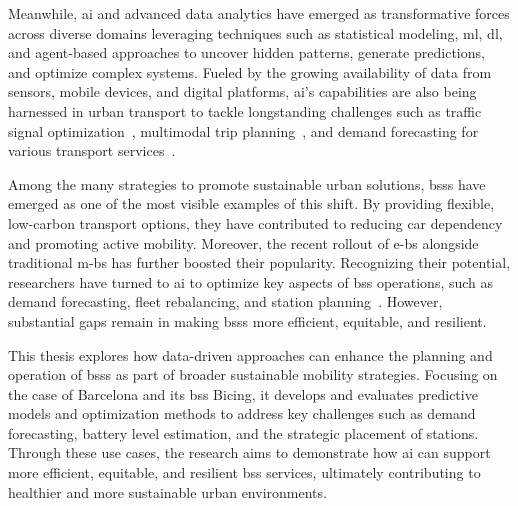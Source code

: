 Meanwhile, \ac{ai} and advanced data analytics have emerged as transformative forces across diverse domains leveraging techniques such as statistical modeling, \ac{ml}, \ac{dl}, and agent-based approaches to uncover hidden patterns, generate predictions, and optimize complex systems. Fueled by the growing availability of data from sensors, mobile devices, and digital platforms, \ac{ai}’s capabilities are also being harnessed in urban transport to tackle longstanding challenges such as traffic signal optimization~\cite{Meess2024}, multimodal trip planning~\cite{Liu2021}, and demand forecasting for various transport services~\cite{Ma2024, Gallo2019}.

Among the many strategies to promote sustainable urban solutions, \acp{bss} have emerged as one of the most visible examples of this shift. By providing flexible, low-carbon transport options, they have contributed to reducing car dependency and promoting active mobility. Moreover, the recent rollout of \acp{e-b} alongside traditional \acp{m-b} has further boosted their popularity. Recognizing their potential, researchers have turned to \ac{ai} to optimize key aspects of \ac{bss} operations, such as demand forecasting, fleet rebalancing, and station planning~\cite{Albuquerque2021, Bahadori2021}. However, substantial gaps remain in making \acp{bss} more efficient, equitable, and resilient.

This thesis explores how data-driven approaches can enhance the planning and operation of \acp{bss} as part of broader sustainable mobility strategies. Focusing on the case of Barcelona and its \ac{bss} Bicing, it develops and evaluates predictive models and optimization methods to address key challenges such as demand forecasting, battery level estimation, and the strategic placement of stations. Through these use cases, the research aims to demonstrate how \ac{ai} can support more efficient, equitable, and resilient \ac{bss} services, ultimately contributing to healthier and more sustainable urban environments.
















